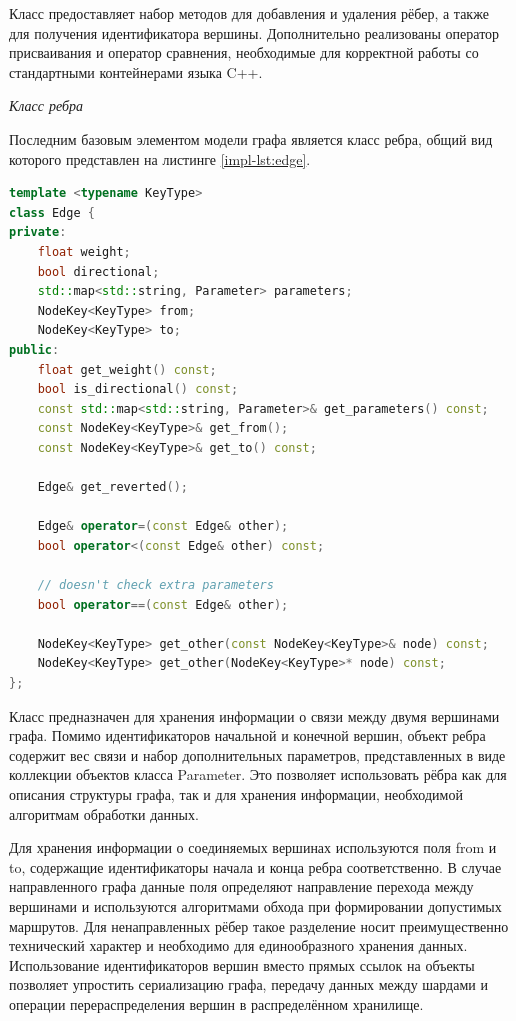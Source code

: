 Класс предоставляет набор методов для добавления и удаления рёбер, а также для получения идентификатора вершины. Дополнительно реализованы оператор присваивания и оператор сравнения, необходимые для корректной работы со стандартными контейнерами языка C++.

\textit{Класс ребра}

Последним базовым элементом модели графа является класс ребра, общий вид которого представлен на листинге \ref{impl-lst:edge}.

\begin{lstlisting}[language=C++, caption=Класс Edge, label=impl-lst:edge]
template <typename KeyType>
class Edge {
private:
    float weight;
    bool directional;
    std::map<std::string, Parameter> parameters;
    NodeKey<KeyType> from;
    NodeKey<KeyType> to;
public:
    float get_weight() const;
    bool is_directional() const;
    const std::map<std::string, Parameter>& get_parameters() const;
    const NodeKey<KeyType>& get_from();
    const NodeKey<KeyType>& get_to() const;

    Edge& get_reverted();
    
    Edge& operator=(const Edge& other);
    bool operator<(const Edge& other) const;

    // doesn't check extra parameters
    bool operator==(const Edge& other);
    
    NodeKey<KeyType> get_other(const NodeKey<KeyType>& node) const;
    NodeKey<KeyType> get_other(NodeKey<KeyType>* node) const;
};
\end{lstlisting}

Класс предназначен для хранения информации о связи между двумя вершинами графа. Помимо идентификаторов начальной и конечной вершин, объект ребра содержит вес связи и набор дополнительных параметров, представленных в виде коллекции объектов класса Parameter. Это позволяет использовать рёбра как для описания структуры графа, так и для хранения информации, необходимой алгоритмам обработки данных.

Для хранения информации о соединяемых вершинах используются поля from и to, содержащие идентификаторы начала и конца ребра соответственно. В случае направленного графа данные поля определяют направление перехода между вершинами и используются алгоритмами обхода при формировании допустимых маршрутов. Для ненаправленных рёбер такое разделение носит преимущественно технический характер и необходимо для единообразного хранения данных. Использование идентификаторов вершин вместо прямых ссылок на объекты позволяет упростить сериализацию графа, передачу данных между шардами и операции перераспределения вершин в распределённом хранилище.

